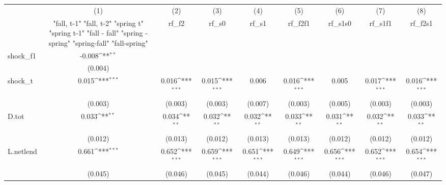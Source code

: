 {
\def\sym#1{\ifmmode^{#1}\else\(^{#1}\)\fi}
\begin{tabular}{l*{8}{c}}
\toprule
            &\multicolumn{1}{c}{(1)}&\multicolumn{1}{c}{(2)}&\multicolumn{1}{c}{(3)}&\multicolumn{1}{c}{(4)}&\multicolumn{1}{c}{(5)}&\multicolumn{1}{c}{(6)}&\multicolumn{1}{c}{(7)}&\multicolumn{1}{c}{(8)}\\
            &\multicolumn{1}{c}{  "fall, t-1" "fall, t-2" "spring t" "spring t-1"  "fall - fall" "spring - spring" "spring-fall" "fall-spring" }&\multicolumn{1}{c}{rf\_f2}&\multicolumn{1}{c}{rf\_s0}&\multicolumn{1}{c}{rf\_s1}&\multicolumn{1}{c}{rf\_f2f1}&\multicolumn{1}{c}{rf\_s1s0}&\multicolumn{1}{c}{rf\_s1f1}&\multicolumn{1}{c}{rf\_f2s1}\\
\midrule
shock\_f1    &      -0.008\sym{**} &                     &                     &                     &                     &                     &                     &                     \\
            &     (0.004)         &                     &                     &                     &                     &                     &                     &                     \\
\addlinespace
shock\_t     &       0.015\sym{***}&       0.016\sym{***}&       0.015\sym{***}&       0.006         &       0.016\sym{***}&       0.005         &       0.017\sym{***}&       0.016\sym{***}\\
            &     (0.003)         &     (0.003)         &     (0.003)         &     (0.007)         &     (0.003)         &     (0.005)         &     (0.003)         &     (0.003)         \\
\addlinespace
D.tot       &       0.033\sym{**} &       0.034\sym{**} &       0.032\sym{**} &       0.032\sym{**} &       0.033\sym{**} &       0.031\sym{**} &       0.032\sym{**} &       0.033\sym{**} \\
            &     (0.012)         &     (0.013)         &     (0.012)         &     (0.013)         &     (0.013)         &     (0.012)         &     (0.012)         &     (0.012)         \\
\addlinespace
L.netlend   &       0.661\sym{***}&       0.652\sym{***}&       0.659\sym{***}&       0.651\sym{***}&       0.649\sym{***}&       0.656\sym{***}&       0.652\sym{***}&       0.654\sym{***}\\
            &     (0.045)         &     (0.046)         &     (0.045)         &     (0.044)         &     (0.046)         &     (0.044)         &     (0.046)         &     (0.047)         \\

\end{tabular}}
